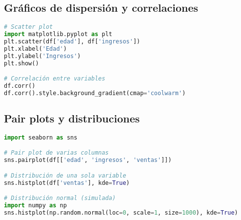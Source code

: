 \documentclass[11pt]{article}
\begin{document}
\subsection*{Gráficos de dispersión y correlaciones}
\begin{lstlisting}[language=Python]
# Scatter plot
import matplotlib.pyplot as plt
plt.scatter(df['edad'], df['ingresos'])
plt.xlabel('Edad')
plt.ylabel('Ingresos')
plt.show()

# Correlación entre variables
df.corr()
df.corr().style.background_gradient(cmap='coolwarm')
\end{lstlisting}

\subsection*{Pair plots y distribuciones}
\begin{lstlisting}[language=Python]
import seaborn as sns

# Pair plot de varias columnas
sns.pairplot(df[['edad', 'ingresos', 'ventas']])

# Distribución de una sola variable
sns.histplot(df['ventas'], kde=True)

# Distribución normal (simulada)
import numpy as np
sns.histplot(np.random.normal(loc=0, scale=1, size=1000), kde=True)
\end{lstlisting}
\end{document}
